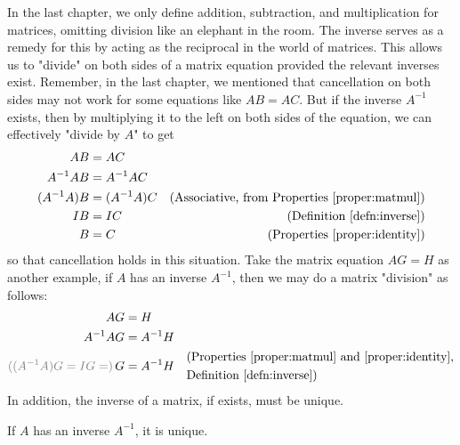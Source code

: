 In the last chapter, we only define addition, subtraction, and multiplication for matrices, omitting division like an elephant in the room. The inverse serves as a remedy for this by acting as the reciprocal in the world of matrices. This allows us to "divide" on both sides of a matrix equation provided the relevant inverses exist. Remember, in the last chapter, we mentioned that cancellation on both sides may not work for some equations like $AB = AC$. But if the inverse $A^{-1}$ exists, then by multiplying it to the left on both sides of the equation, we can effectively "divide by $A$" to get
\begin{align*}
AB &= AC \\
A^{-1}AB &= A^{-1}AC \\
(A^{-1}A)B &= (A^{-1}A)C & \text{(Associative, from Properties \ref{proper:matmul})} \\
IB &= IC & \text{(Definition \ref{defn:inverse})} \\
B &= C & \text{(Properties \ref{proper:identity})}
\end{align*}
so that cancellation holds in this situation. Take the matrix equation $AG = H$ as another example, if $A$ has an inverse $A^{-1}$, then we may do a matrix "division" as follows:
\begin{align*}
AG &= H \\
A^{-1}AG &= A^{-1}H \\
\textcolor{gray}{((A^{-1}A)G = IG =)} \, G &= A^{-1}H & 
\begin{aligned}
& \text{(Properties \ref{proper:matmul} and \ref{proper:identity},} \\    
& \text{Definition \ref{defn:inverse})}
\end{aligned} 
\end{align*}
In addition, the inverse of a matrix, if exists, must be unique.
\begin{proper}
\label{proper:uniqueinverse}
If $A$ has an inverse $A^{-1}$, it is unique.
\end{proper}

